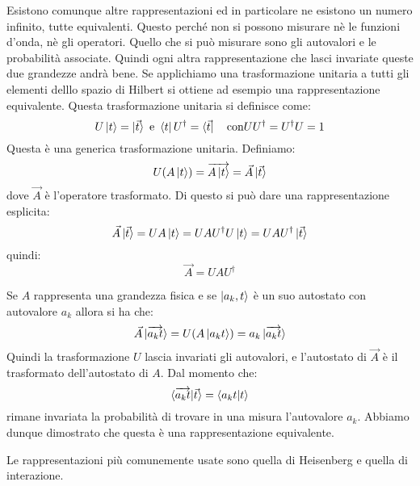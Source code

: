 Esistono comunque altre rappresentazioni ed in particolare ne esistono un numero
infinito, tutte equivalenti. Questo perché non si possono misurare nè le
funzioni d'onda, nè gli operatori. Quello che si può misurare sono gli
autovalori e le probabilità associate.
Quindi ogni altra rappresentazione che lasci invariate queste due grandezze
andrà bene.
Se applichiamo una trasformazione unitaria a tutti gli elementi delllo spazio di
Hilbert si ottiene ad esempio una rappresentazione equivalente.
Questa trasformazione unitaria si definisce come:
\begin{equation}
  U\ket{t}=\ket{\vec{t}}  \text{ e } \bra{t}U^{\dag}=\bra{\vec{t}} \quad \text{con} UU^{\dag}=U^{\dagger}U=1
\end{equation}
Questa è una generica trasformazione unitaria. Definiamo:
\begin{equation}
U(A\ket{t})=\overrightarrow{A\ket{t}}=\vec{A}\ket{\vec{t}}
\end{equation}
dove $\vec{A}$ è l'operatore trasformato. Di questo si può dare una
rappresentazione esplicita:
\begin{equation}
\vec{A}\ket{\vec{t}}=UA\ket{t}=UAU^{\dag}U\ket{t}=UAU^{\dag}\ket{\vec{t}}
\end{equation}
quindi:
\begin{equation}
\vec{A}=UAU^{\dag}
\end{equation}

Se $A$ rappresenta una grandezza fisica e se $\ket{a_{k},t}$ è un suo autostato
con autovalore $a_{k}$ allora si ha che:
\begin{equation}
  \vec{A}\ket{\overrightarrow{a_{k}t}}=U(A\ket{a_{k}t})=a_{k}\ket{\overrightarrow{a_{k}t}}
\end{equation}
Quindi la trasformazione $U$ lascia invariati gli autovalori, e l'autostato di
$\vec{A}$ è il trasformato dell'autostato di $A$. Dal momento che:
\begin{equation}
\braket{\overrightarrow{a_{k}t}|\vec{t}}=\braket{a_{k}t|t}
\end{equation}
rimane invariata la probabilità di trovare in una misura l'autovalore $a_{k}$.
Abbiamo dunque dimostrato che questa è una rappresentazione equivalente.

Le rappresentazioni più comunemente usate sono quella di Heisenberg e quella di
interazione.

